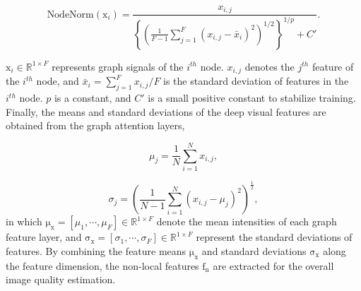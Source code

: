 \begin{equation}
	\text{NodeNorm}\left(\boldsymbol{\mathrm x}_{i}\right)=\frac{x_{i, j}}{\left\{\left(\frac{1}{F-1}\sum_{j=1}^F (x_{i, j}-\bar{{x}}_i)^2\right)^{1/2}\right\}^{1/p} + C'}.
	\label{nodenorm}
\end{equation}

\indent$\boldsymbol{\mathrm x}_i \in\mathbb{R}^{1 \times F}$ represents graph signals of the $i^{th}$ node. $x_{i, j}$ denotes the $j^{th}$ feature of the $i^{th}$ node, and ${\bar{x}}_{i}=\sum_{j=1}^F x_{i, j}/F$ is the standard deviation of features in the $i^{th}$ node. $p$ is a constant, and $C'$ is a small positive constant to stabilize training. Finally, the means and standard deviations of the deep visual features are obtained from the graph attention layers,

\begin{equation}
	{\mu}_{j}=\frac{1}{N} \sum_{i=1}^{N} x_{i, j},
\end{equation}

\begin{equation}
	{\sigma_{j}}=\left(\frac{1}{N-1} \sum_{i=1}^{N}\left({x}_{i, j}-{\mu_{j}}\right)^{2}\right)^{\frac{1}{2}},
\end{equation}
in which $\boldsymbol{\mathrm{\mu_x}}=[{\mu}_{1},\cdots,{\mu}_{F}]\in\mathbb{R}^{1 \times F}$ denote the mean intensities of each graph feature layer, and $\boldsymbol{\mathrm{\sigma_{x}}}=[\sigma_{1},\cdots,\sigma_{F}]\in\mathbb{R}^{1 \times F}$ represent the standard deviations of features. By combining the feature means $\boldsymbol{\mathrm{\mu_{x}}}$ and standard deviations $\boldsymbol{\mathrm{\sigma_{x}}}$ along the feature dimension, the non-local features $\boldsymbol{\mathrm{f_{n}}}$ are extracted for the overall image quality estimation.

